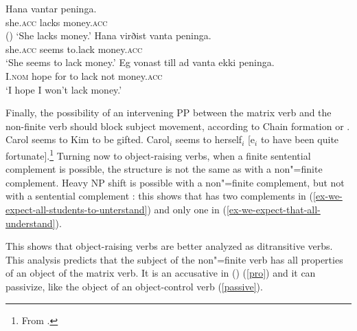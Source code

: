 \eal
\ex 
\gll Hana             vantar peninga.\\
     she.\textsc{acc} lacks  money.\textsc{acc} \\\hfill()
\glt `She lacks money.'
\ex 
\gll Hana             virðist vanta   peninga.\label{need} \\
     she.\textsc{acc} seems   to.lack money.\textsc{acc} \\
\glt `She seems to lack money.'
\ex 
\gll Eg             vonast till ad vanta ekki peninga. \label{hope-i} \\
     I.\textsc{nom} hope   for  to lack  not  money.\textsc{acc} \\
\glt `I hope I won't lack money.'
\zl

Finally, the possibility of an intervening PP between the matrix verb and the non-finite verb should
block subject movement, according to Chain formation or 
\citep{Rizzi1986,Rizzi1990b-u}.
\eal
\ex Carol seems to Kim to be gifted.
\ex Carol$_i$ seems to herself$_i$ [e$_i$ to have been quite fortunate].\footnote{
From \citet[]{McGinnis2004a-u}.
}
\zl
Turning now to object-raising verbs, when a finite sentential complement is possible, the structure
is not the same as  with a non"=finite complement. Heavy NP shift is possible with a non"=finite
complement, but not with a sentential complement \parencites[]{Bresnan1982}[]{PollardandSag1994}: this shows that  has two complements in (\ref{ex-we-expect-all-students-to-unterstand}) and only one in (\ref{ex-we-expect-that-all-understand}).

\eal
{}
\zl



\noindent
This shows that object-raising verbs are better analyzed as ditransitive verbs. This analysis predicts that the subject of the non"=finite verb has all properties of an object of the matrix verb. It is an accusative in  () (\ref{pro}) and it can passivize, like the object of an object-control verb (\ref{passive}).

